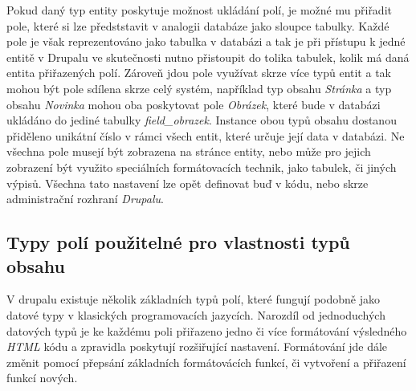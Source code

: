 Pokud daný typ entity poskytuje možnost ukládání polí, je možné mu přiřadit pole, které si lze předststavit v analogii databáze jako sloupce tabulky. Každé pole je však reprezentováno jako tabulka v databázi a tak je při přístupu k jedné entitě v Drupalu ve skutečnosti nutno přistoupit do tolika tabulek, kolik má daná entita přiřazených polí. Zároveň jdou pole využívat skrze více typů entit a tak mohou být pole sdílena skrze celý systém, například typ obsahu \emph{Stránka} a typ obsahu \emph{Novinka} mohou oba poskytovat pole \emph{Obrázek}, které bude v databázi ukládáno do jediné tabulky \emph{field\_obrazek}. Instance obou typů obsahu dostanou přiděleno unikátní číslo v rámci všech entit, které určuje její data v databázi. Ne všechna pole musejí být zobrazena na stránce entity, nebo může pro jejich zobrazení být využito speciálních formátovacích technik, jako tabulek, či jiných výpisů. Všechna tato nastavení lze opět definovat buď v kódu, nebo skrze administrační rozhraní \emph{Drupalu}.

\subsection{Typy polí použitelné pro vlastnosti typů obsahu}
V drupalu existuje několik základních typů polí, které fungují podobně jako datové typy v klasických programovacích jazycích. Narozdíl od jednoduchých datových typů je ke každému poli přiřazeno jedno či více formátování výsledného \emph{HTML} kódu a zpravidla poskytují rozšiřující nastavení. Formátování jde dále změnit pomocí přepsání základních formátovácích funkcí, či vytvoření a přiřazení funkcí nových.

